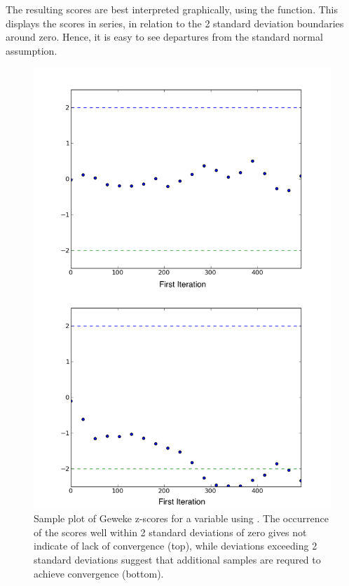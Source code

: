 \documentclass[letterpaper,10pt,english]{sphinxmanual}
\begin{document}
The resulting scores are best interpreted graphically, using the  function. This displays the scores in series, in relation to the 2 standard deviation boundaries around zero. Hence, it is easy to see departures from the standard normal assumption.
\begin{figure}[htbp]
\centering
\capstart

\includegraphics{geweke.png}
\caption{Sample plot of Geweke z-scores for a variable using .
The occurrence of the scores well within 2 standard deviations of zero
gives not indicate of lack of convergence (top), while deviations exceeding
2 standard deviations suggest that additional samples are requred to
achieve convergence (bottom).}\label{modelchecking:geweke}\end{figure}
\end{document}
